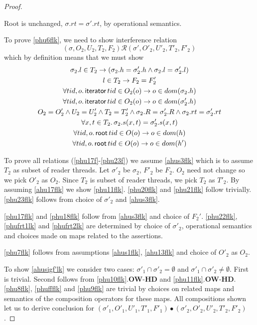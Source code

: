 \begin{proof}
\begin{case}
Root is unchanged, $\sigma.rt = \sigma'.rt$, by operational semantics.
\end{case}

To prove \ref{phu6flk}, we need to show  interference relation
\[(\sigma, O_2, U_2, T_2,F_2) \mathcal{R} (\sigma', O'_2, U'_2, T'_2,F'_2)  \]
which by definition means that we must show 
\begin{gather}\label{phu17flk}
  \sigma_2.l  \in  T_2 \rightarrow (\sigma_2.h =\sigma'_2.h \land \sigma_2.l=\sigma'_2.l)\\
  \label{phu18flk}
  l\in T_2\rightarrow F_2=F_2'\\
  \label{phu20flk}
  \forall tid,o\ldotp\textsf{iterator} \, tid \in O_2(o) \rightarrow o \in dom(\sigma_2.h) \\
  \label{phu21flk}
  \forall tid,o\ldotp\textsf{iterator} \, tid \in O_2(o) \rightarrow o \in dom(\sigma'_2.h) \\
  \label{phu22flk}
  O_2 = O_2' \land U_2 = U_2' \land T_2 = T_2' \land \sigma_2.R = \sigma'_2.R \land \sigma_2.rt = \sigma'_2.rt \\
  \label{phu23flk}
  \forall x, t \in T_2 \ldotp \sigma_2.s(x,t) = \sigma'_2.s(x,t) \\
    \label{phufrt1lk}
  \forall tid,o\ldotp\textsf{root} \, tid \in O(o) \rightarrow o \in dom(h) \\
  \label{phufrt2lk}
  \forall tid,o\ldotp\textsf{root} \, tid \in O(o) \rightarrow o \in dom(h') 
\end{gather}

To prove all relations (\ref{phu17f}-\ref{phu23f}) we assume \ref{ahus3flk} which is to assume $T_2$ as subset of reader threads. Let $\sigma'_2$ be $\sigma_2$, $F'_2$ be $F_2$. $O_2$ need not change so we pick $O'_2$  as $O_2$. Since $T_2$ is subset of reader threads, we pick $T_2$ as  $T'_2$. By assuming \ref{ahu17flk}  we show \ref{phu11flk}. \ref{phu20flk} and \ref{phu21flk} follow trivially. \ref{phu23flk} follows from choice of $\sigma'_2$ and \ref{ahus3flk}.

\ref{phu17flk} and \ref{phu18flk} follow from \ref{ahus3flk} and choice of $F_2'$. \ref{phu22flk}, \ref{phufrt1lk} and \ref{phufrt2lk} are determined by  choice of $\sigma'_2$, operational semantics and choices made on maps related to the assertions.

\ref{phu7flk} follows from assumptions \ref{ahus1flk}, \ref{ahu13flk} and choice of $O'_2$ as $O_2$.

To show \ref{ahusigf'lk} we consider two cases: $\sigma'_1 \cap \sigma'_2 = \emptyset$ and $\sigma'_1 \cap \sigma'_2 \neq \emptyset$. First is trivial. Second follows from \ref{phu10flk}.\textbf{OW}-\textbf{HD} and \ref{phu11flk}.\textbf{OW}-\textbf{HD}. \ref{phu8flk}, \ref{phuffflk} and \ref{phu9flk} are trivial by choices on related maps and semantics of the composition operators for these maps. All compositions shown  let us to derive conclusion for $(\sigma'_1, O'_1, U'_1, T'_1,F'_1) \bullet (\sigma'_2, O'_2, U'_2, T'_2,F'_2) $.
 \end{proof}
